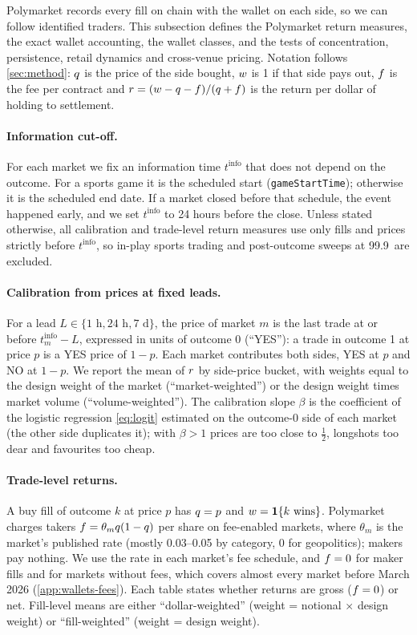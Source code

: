 Polymarket records every fill on chain with the wallet on each side, so we can follow identified
traders. This subsection defines the Polymarket return measures, the exact wallet accounting, the
wallet classes, and the tests of concentration, persistence, retail dynamics and cross-venue
pricing. Notation follows \cref{sec:method}: $q$ is the price of the side bought, $w$ is 1 if
that side pays out, $f$ is the fee per contract and $r=(w-q-f)/(q+f)$ is the return
per dollar of holding to settlement.

\paragraph{Information cut-off.}
For each market we fix an information time $t^{\mathrm{info}}$ that does not depend on the
outcome. For a sports game it is the scheduled start (\texttt{gameStartTime}); otherwise it is the
scheduled end date. If a market closed before that schedule, the event happened early, and we set
$t^{\mathrm{info}}$ to 24 hours before the close. Unless stated otherwise, all calibration and
trade-level return measures use only fills and prices strictly before $t^{\mathrm{info}}$, so
in-play sports trading and post-outcome sweeps at 99.9\cents\ are excluded.

\paragraph{Calibration from prices at fixed leads.}
For a lead $L\in\{1\text{ h}, 24\text{ h}, 7\text{ d}\}$, the price of market $m$ is the last
trade at or before $t^{\mathrm{info}}_m-L$, expressed in units of outcome 0 (``YES''): a trade in
outcome 1 at price $p$ is a YES price of $1-p$. Each market contributes both sides, YES at $p$ and NO
at $1-p$. We report the mean of $r$ by side-price bucket, with weights equal to the design weight
of the market (``market-weighted'') or the design weight times market volume
(``volume-weighted''). The calibration slope $\beta$ is the coefficient of the logistic regression
\eqref{eq:logit} estimated on the outcome-0 side of each market (the other side duplicates it); with
$\beta>1$ prices are too close to $\tfrac12$, longshots too dear and favourites too cheap.

\paragraph{Trade-level returns.}
A buy fill of outcome $k$ at price $p$ has $q=p$ and $w=\mathbf{1}\{k \text{ wins}\}$. Polymarket
charges takers $f=\theta_mq(1-q)$ per share on fee-enabled markets, where $\theta_m$ is the
market's published rate (mostly 0.03--0.05 by category, 0 for geopolitics); makers pay nothing. We use
the rate in each market's fee schedule, and $f=0$ for maker fills and for markets without fees,
which covers almost every market before March 2026 (\cref{app:wallets-fees}). Each table states whether returns are
gross ($f=0$) or net.
Fill-level means are either ``dollar-weighted'' (weight = notional $\times$ design weight) or
``fill-weighted'' (weight = design weight).

